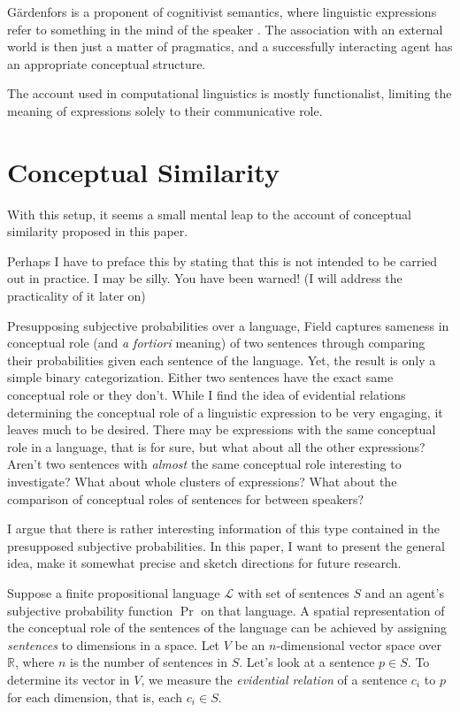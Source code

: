 \documentclass[11pt, a4paper]{article}
\renewcommand{\i}[1]{\emph{#1}}
\begin{document}
Gärdenfors is a proponent of cognitivist semantics, where linguistic expressions refer to something in the mind of the speaker \parencite[154]{gärdenfors2004conceptual}. The association with an external world is then just a matter of pragmatics, and a successfully interacting agent has an appropriate conceptual structure. 

The account used in computational linguistics is mostly functionalist, limiting the meaning of expressions solely to their communicative role. 
\section{Conceptual Similarity}

With this setup, it seems a small mental leap to the account of conceptual similarity proposed in this paper. 

Perhaps I have to preface this by stating that this is not intended to be carried out in practice. I may be silly. You have been warned! (I will address the practicality of it later on)

Presupposing subjective probabilities over a language, Field captures sameness in conceptual role (and \i{a fortiori} meaning) of two sentences through comparing their probabilities given each sentence of the language. Yet, the result is only a simple binary categorization. Either two sentences have the exact same conceptual role or they don't. While I find the idea of evidential relations determining the conceptual role of a linguistic expression to be very engaging, it leaves much to be desired. There may be expressions with the same conceptual role in a language, that is for sure, but what about all the other expressions? Aren't two sentences with \i{almost} the same conceptual role interesting to investigate? What about whole clusters of expressions? What about the comparison of conceptual roles of sentences for between speakers?

I argue that there is rather interesting information of this type contained in the presupposed subjective probabilities. In this paper, I want to present the general idea, make it somewhat precise and sketch directions for future research.

Suppose a finite propositional language $\mathcal{L}$ with set of sentences $S$ and an agent's subjective probability function $\Pr$ on that language. A spatial representation of the conceptual role of the sentences of the language can be achieved by assigning \i{sentences} to dimensions in a space. Let $V$ be an $n$-dimensional vector space over $\mathbb{R}$, where $n$ is the number of sentences in $S$. Let's look at a sentence $p \in S$. To determine its vector in $V$, we measure the \i{evidential relation} of a sentence $c_i$ to $p$ for each dimension, that is, each $c_i \in S$. 
\end{document}
